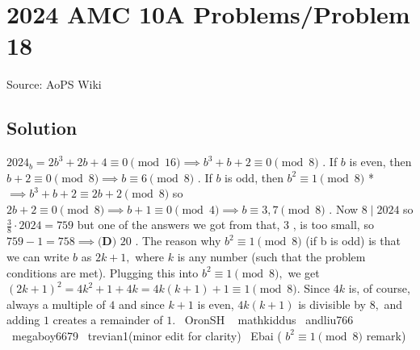 \documentclass[12pt]{article}
\begin{document}
\section*{{2024 AMC 10A Problems/Problem 18}}
Source: AoPS Wiki

\subsection*{Solution}
$2024_b = 2b^3+2b+4\equiv 0\pmod{16}\implies b^3+b+2\equiv 0\pmod 8$ . If $b$ is even, then $b+2\equiv 0\pmod 8\implies b\equiv 6\pmod 8$ . If $b$ is odd, then $b^2\equiv 1\pmod 8$ * $\implies b^3+b+2\equiv 2b+2\pmod 8$ so $2b+2\equiv 0\pmod 8\implies b+1\equiv 0\pmod 4\implies b\equiv 3,7\pmod 8$ . Now $8\mid 2024$ so $\frac38\cdot 2024=759$ but one of the answers we got from that, $3$ , is too small, so $759 - 1 = 758\implies\boxed{\textbf{(D) }20}$ . The reason why $b^2\equiv 1\pmod 8$ (if b is odd) is that we can write $b$ as $2k+1,$ where $k$ is any number (such that the problem conditions are met). Plugging this into $b^2\equiv 1\pmod 8,$ we get $(2k+1)^2=4k^2+1+4k=4k(k+1)+1\equiv 1\pmod 8.$ Since $4k$ is, of course, always a multiple of $4$ and since $k+1$ is even, $4k(k+1)$ is divisible by $8,$ and adding $1$ creates a remainder of $1.$ ~OronSH ~ mathkiddus ~andliu766 ~megaboy6679 ~trevian1(minor edit for clarity) ~Ebai ( $b^2\equiv 1\pmod 8$ remark)
\end{document}
